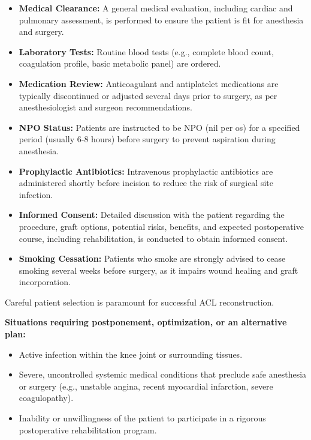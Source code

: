 \begin{itemize}
  \item \textbf{Medical Clearance:} A general medical evaluation, including cardiac and pulmonary assessment, is performed to ensure the patient is fit for anesthesia and surgery.
  
  \item \textbf{Laboratory Tests:} Routine blood tests (e.g., complete blood count, coagulation profile, basic metabolic panel) are ordered.
  
  \item \textbf{Medication Review:} Anticoagulant and antiplatelet medications are typically discontinued or adjusted several days prior to surgery, as per anesthesiologist and surgeon recommendations.
  
  \item \textbf{NPO Status:} Patients are instructed to be NPO (nil per os) for a specified period (usually 6-8 hours) before surgery to prevent aspiration during anesthesia.
  
  \item \textbf{Prophylactic Antibiotics:} Intravenous prophylactic antibiotics are administered shortly before incision to reduce the risk of surgical site infection.
  
  \item \textbf{Informed Consent:} Detailed discussion with the patient regarding the procedure, graft options, potential risks, benefits, and expected postoperative course, including rehabilitation, is conducted to obtain informed consent.
  
  \item \textbf{Smoking Cessation:} Patients who smoke are strongly advised to cease smoking several weeks before surgery, as it impairs wound healing and graft incorporation.
\end{itemize}

Careful patient selection is paramount for successful ACL reconstruction.

\textbf{Situations requiring postponement, optimization, or an alternative plan:}
\begin{itemize}
  \item Active infection within the knee joint or surrounding tissues.
  
  \item Severe, uncontrolled systemic medical conditions that preclude safe anesthesia or surgery (e.g., unstable angina, recent myocardial infarction, severe coagulopathy).
  
  \item Inability or unwillingness of the patient to participate in a rigorous postoperative rehabilitation program.
\end{itemize}

